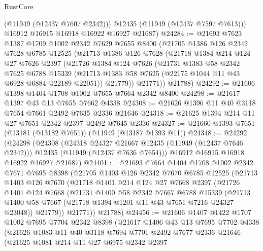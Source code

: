 \begin{lexlean}{RustCore}
\begin{coremodule}
          (@11949 (@12437 @7607 @2342)))
        @12435
        (@11949 (@12437 @7597 @7613)))
      @16912
      @16915
      @16918
      @16922
      @16927
      @21687)
@24284 := @21693
    @7623
    @1387
    @1709
    @1002
    @2342
    @7629
    @7655
    @8400
    (@21705
      @1386
      @126
      @2342
      @7628
      @6785
      @12525
      (@21713
        @1386
        @126
        @7628
        (@21718
          @1384
          @214
          @124
          @27
          @7626
          @2397
          (@21726
            @1384
            @124
            @7626
            (@21731
              @1383
              @58
              @2342
              @7625
              @6788
              @15339
              (@21713 @1383 @58 @7625 (@22175 @1044 @11 @43 @6928 @6884 @22189 @22051))
              @21779))
          @21771))
      @21788)
@24292 := @21606 @1398 @1404 @1708 @1002 @7655 @7664 @2342 @8400
@24298 := @21617 @1397 @43 @13 @7655 @7662 @4338
@24308 := @21626 @1396 @11 @40 @3118 @7654 @7661 @2492 @7635 @2336 @21646
@24318 := @21625 @1394 @214 @11 @27 @7651 @2342 @2397 @2492 @7645 @2336
@24327 := @21660 @1393 @7651 (@13181 (@13182 @7651)) (@11949 (@13187 @1393 @11))
@24348 := @24292
    (@24298
      (@24308
        (@24318 @24327 @21667 @12435 (@11949 (@12437 @7646 @2342)))
        @12435
        (@11949 (@12437 @7636 @7654)))
      @16912
      @16915
      @16918
      @16922
      @16927
      @21687)
@24401 := @21693
    @7664
    @1404
    @1708
    @1002
    @2342
    @7671
    @7695
    @8398
    (@21705
      @1403
      @126
      @2342
      @7670
      @6785
      @12525
      (@21713
        @1403
        @126
        @7670
        (@21718
          @1401
          @214
          @124
          @27
          @7668
          @2397
          (@21726
            @1401
            @124
            @7668
            (@21731
              @1400
              @58
              @2342
              @7667
              @6788
              @15339
              (@21713 @1400 @58 @7667 (@21718 @1394 @1201 @11 @43 @7651 @7216 @24327 @23048))
              @21779))
          @21771))
      @21788)
@24456 := @21606
    @1407
    @1422
    @1707
    @1002
    @7695
    @7704
    @2342
    @8398
    (@21617
      @1406
      @43
      @13
      @7695
      @7702
      @4338
      (@21626
        @1083
        @11
        @40
        @3118
        @7694
        @7701
        @2492
        @7677
        @2336
        @21646
        (@21625
          @1081
          @214
          @11
          @27
          @6975
          @2342
          @2397

\end{coremodule}
\end{lexlean}
